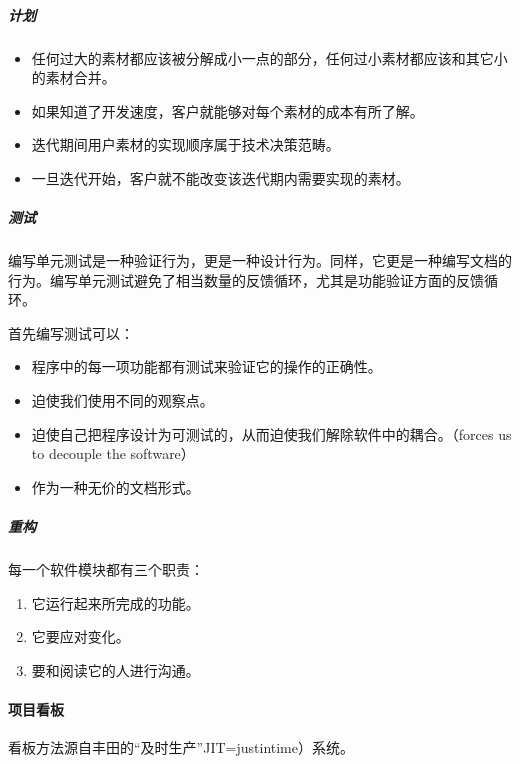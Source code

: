 \documentclass[letterpaper,11pt,english]{sphinxmanual}
\begin{document}
\subparagraph{计划}
\label{\detokenize{chapter_project/Scrum:id8}}\begin{itemize}
\item {} 
任何过大的素材都应该被分解成小一点的部分，任何过小素材都应该和其它小的素材合并。

\item {} 
如果知道了开发速度，客户就能够对每个素材的成本有所了解。

\item {} 
迭代期间用户素材的实现顺序属于技术决策范畴。

\item {} 
一旦迭代开始，客户就不能改变该迭代期内需要实现的素材。

\end{itemize}


\subparagraph{测试}
\label{\detokenize{chapter_project/Scrum:id9}}
编写单元测试是一种验证行为，更是一种设计行为。同样，它更是一种编写文档的行为。编写单元测试避免了相当数量的反馈循环，尤其是功能验证方面的反馈循环。

首先编写测试可以：
\begin{itemize}
\item {} 
程序中的每一项功能都有测试来验证它的操作的正确性。

\item {} 
迫使我们使用不同的观察点。

\item {} 
迫使自己把程序设计为可测试的，从而迫使我们解除软件中的耦合。（forces
us to decouple the software）

\item {} 
作为一种无价的文档形式。

\end{itemize}


\subparagraph{重构}
\label{\detokenize{chapter_project/Scrum:id10}}
每一个软件模块都有三个职责：
\begin{enumerate}
%
\item {} 
它运行起来所完成的功能。

\item {} 
它要应对变化。

\item {} 
要和阅读它的人进行沟通。

\end{enumerate}


\paragraph{项目看板}
\label{\detokenize{chapter_project/Scrum:id11}}
看板方法源自丰田的“及时生产”JIT=just\sphinxhyphen{}in\sphinxhyphen{}time）系统。
\end{document}
